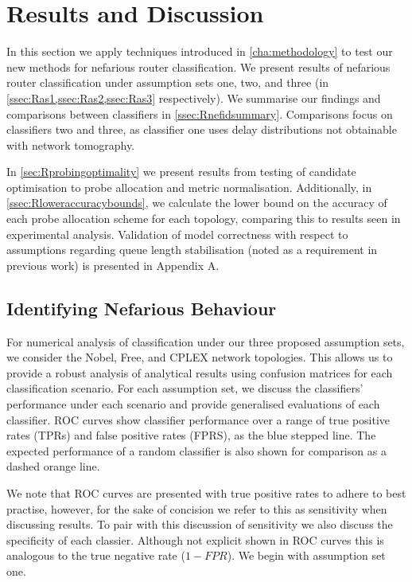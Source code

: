 \chapter{Results and Discussion}
\label{cha:result}
In this section we apply techniques introduced in \cref{cha:methodology} to test our new methods for nefarious router classification. We present results of nefarious router classification under assumption sets one, two, and three (in \cref{ssec:Ras1,ssec:Ras2,ssec:Ras3} respectively). We summarise our findings and comparisons between classifiers in \cref{ssec:Rnefidsummary}. Comparisons focus on classifiers two and three, as classifier one uses delay distributions not obtainable with network tomography.\par
In \cref{sec:Rprobingoptimality} we present results from testing of candidate optimisation to probe allocation and metric normalisation. Additionally, in \cref{ssec:Rloweraccuracybounds}, we calculate the lower bound on the accuracy of each probe allocation scheme for each topology, comparing this to results seen in experimental analysis. Validation of model correctness with respect to assumptions regarding queue length stabilisation (noted as a requirement in previous work) is presented in Appendix A.

\section{Identifying Nefarious Behaviour}
\label{sec:Rnefarouterdetection}
For numerical analysis of classification under our three proposed assumption sets, we consider the Nobel, Free, and CPLEX network topologies. This allows us to provide a robust analysis of analytical results using confusion matrices for each classification scenario. For each assumption set, we discuss the classifiers' performance under each scenario and provide generalised evaluations of each classifier. ROC curves show classifier performance over a range of true positive rates (TPRs) and false positive rates (FPRS), as the blue stepped line. The expected performance of a random classifier is also shown for comparison as a dashed orange line.\par
We note that ROC curves are presented with true positive rates to adhere to best practise, however, for the sake of concision we refer to this as sensitivity when discussing results. To pair with this discussion of sensitivity we also discuss the specificity of each classier. Although not explicit shown in ROC curves this is analogous to the true negative rate ($1-FPR$). We begin with assumption set one.

